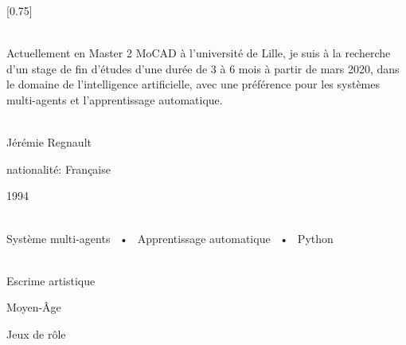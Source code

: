 \documentclass[lighthipster]{simplehipstercv}
\begin{document}
\setlength{\columnsep}{1.5cm}
[0.75]
\begin{paracol}{2}

\paracolbackgroundoptions



\footnotesize
{\setasidefontcolour
\flushright
\begin{center}
\end{center}

\\[0.5em]

{\footnotesize
Actuellement en Master 2 MoCAD à l'université de Lille,
je suis à la recherche d'un stage de fin d'études d'une durée de 3 à 6 mois à partir de mars 2020,
dans le domaine de l'intelligence artificielle, avec une préférence pour les systèmes multi-agents et l'apprentissage automatique.}
\bigskip

 \\[0.5em]
Jérémie Regnault

nationalité: Française

1994

\bigskip

 \\[0.5em]

Système multi-agents ~•~ Apprentissage automatique ~•~ Python

\bigskip



\bigskip

\\[0.5em]

Escrime artistique

Moyen-Âge

Jeux de rôle
\bigskip

\vspace{4em}


\phantom{turn the page}

\phantom{turn the page}
}
\switchcolumn


\end{paracol}
\end{document}
